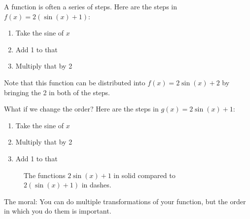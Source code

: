 A function is often a series of steps. Here are the steps in $f(x) = 2(\sin(x) + 1)$:
\begin{enumerate}
\item Take the sine of $x$
\item Add 1 to that
\item Multiply that by 2
\end{enumerate}
Note that this function can be distributed into $f(x) = 2\sin(x) + 2$ by bringing the 2 in both of the steps.

What if we change the order? Here are the steps in $g(x) = 2\sin(x) + 1$:
\begin{enumerate}
\item Take the sine of $x$
\item Multiply that by 2
\item Add 1 to that
\end{enumerate}
\begin{figure}[htbp]
    \centering


    \caption{The functions $2\sin(x)+1$ in solid compared to $2(\sin(x)+1)$ in dashes.}
    \label{fig:orderMattersSin}
\end{figure}


The moral: You can do multiple transformations of your function, but
the order in which you do them is important.


